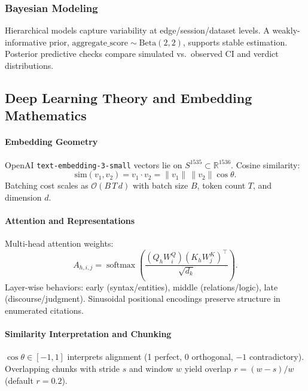 
\subsubsection{Bayesian Modeling}
Hierarchical models capture variability at edge/session/dataset levels. A weakly-informative prior,
\(\text{aggregate\_score} \sim \mathrm{Beta}(2,2)\),
supports stable estimation. Posterior predictive checks compare simulated vs.\ observed CI and verdict distributions.

\subsection{Deep Learning Theory and Embedding Mathematics}

\paragraph{Embedding Geometry}
OpenAI \texttt{text-embedding-3-small} vectors lie on \(S^{1535}\subset\mathbb{R}^{1536}\). Cosine similarity:
\[
\mathrm{sim}(v_1,v_2)= v_1\cdot v_2 = \|v_1\|\,\|v_2\|\cos\theta.
\]
Batching cost scales as \(\mathcal{O}(B\,T\,d)\) with batch size \(B\), token count \(T\), and dimension \(d\).

\paragraph{Attention and Representations}
Multi-head attention weights:
\[
A_{h,i,j} = \operatorname{softmax}\!\left(\frac{(Q_h W_i^Q)(K_h W_j^K)^{\top}}{\sqrt{d_k}}\right).
\]
Layer-wise behaviors: early (syntax/entities), middle (relations/logic), late (discourse/judgment). Sinusoidal positional encodings preserve structure in enumerated citations.

\paragraph{Similarity Interpretation and Chunking}
\(\cos\theta \in [-1,1]\) interprets alignment (1 perfect, 0 orthogonal, \(-1\) contradictory). Overlapping chunks with stride \(s\) and window \(w\) yield overlap \(r=(w-s)/w\) (default \(r=0.2\)).

